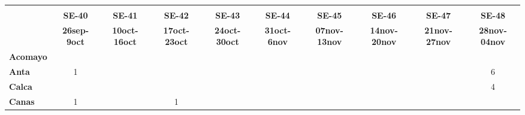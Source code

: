 \begin{tabular}{lccccccccc}
	\textbf{}              & \multicolumn{1}{l}{}                        & \multicolumn{1}{l}{}      & \multicolumn{1}{l}{}                         & \multicolumn{1}{l}{}                         & \multicolumn{1}{l}{}                         & \multicolumn{1}{l}{}                        & \multicolumn{1}{l}{}                         & \multicolumn{1}{l}{}                         & \multicolumn{1}{l}{}     \\
	\textbf{}                                                               
    &\textbf{SE-40}                   
	&\textbf{SE-41}                              &\textbf{SE-42}                   &\textbf{SE-43}                  
	&\textbf{SE-44} 
	&\textbf{SE-45} 							&\textbf{SE-46} 
	&\textbf{SE-47}								&\textbf{SE-48}  \\
		\textbf{}             
  	&\textbf{26sep-9oct}  						&\textbf{10oct-16oct} 
	&\textbf{17oct-23oct} 						&\textbf{24oct-30oct} 		       &\textbf{31oct-6nov}  						&\textbf{07nov-13nov} 
	&\textbf{14nov-20nov} 						&\textbf{21nov-27nov} 	  		&\textbf{28nov-04nov} 	\\
	\textbf{Acomayo}                        	
	&\cellcolor[HTML]{FCC46C}     	    		&\cellcolor[HTML]{FCC46C}                   &\cellcolor[HTML]{FCC46C}          			&\cellcolor[HTML]{FCC46C}                  
	&\cellcolor[HTML]{FCC46C}  			        &\cellcolor[HTML]{FCC46C}          &\cellcolor[HTML]{FCC46C} 					&\cellcolor[HTML]{FCC46C} 	    &\cellcolor[HTML]{FCC46C}\\
	\textbf{Anta}                                                                    
	&1                   					
	& \cellcolor[HTML]{FCC46C}                  &\cellcolor[HTML]{FCC46C}         &\cellcolor[HTML]{FCC46C} 			    
	& \cellcolor[HTML]{FCC46C} 				    &\cellcolor[HTML]{FCC46C}		  &\cellcolor[HTML]{FCC46C}					&\cellcolor[HTML]{FCC46C}					
	&6\\
	\textbf{Calca}      				       
	&\cellcolor[HTML]{FCC46C}         			&\cellcolor[HTML]{FCC46C}       
	&\cellcolor[HTML]{FCC46C}                   &\cellcolor[HTML]{FCC46C}         &\cellcolor[HTML]{FCC46C}                
	&\cellcolor[HTML]{FCC46C}                   &\cellcolor[HTML]{FCC46C}  		  &\cellcolor[HTML]{FCC46C} 					&4 		   \\                										
	\textbf{Canas}                              
	&1                   						&\cellcolor[HTML]{FCC46C}         &1        			              			&\cellcolor[HTML]{FCC46C}                   &\cellcolor[HTML]{FCC46C} 					&\cellcolor[HTML]{FCC46C}         			&\cellcolor[HTML]{FCC46C} 

\end{tabular}
